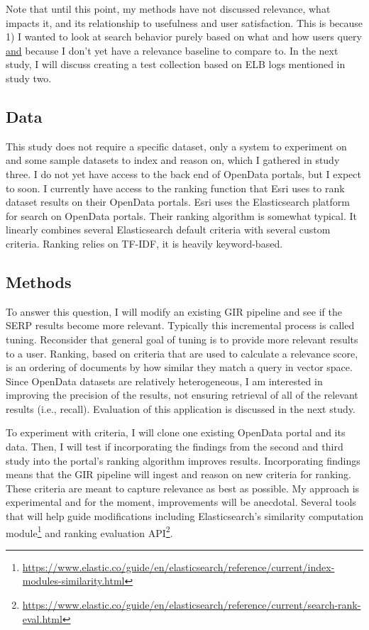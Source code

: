 Note that until this point, my methods have not discussed relevance, what impacts it, and its relationship to usefulness and user satisfaction. This is because 1) I wanted to look at search behavior purely based on what and how users query \underline{and} because I don't yet have a relevance baseline to compare to. In the next study, I will discuss creating a test collection based on ELB logs mentioned in study two.

\subsection{Data}
This study does not require a specific dataset, only a system to experiment on and some sample datasets to index and reason on, which I gathered in study three. I do not yet have access to the back end of OpenData portals, but I expect to soon. I currently have access to the ranking function that Esri uses to rank dataset results on their OpenData portals. Esri uses the Elasticsearch platform for search on OpenData portals. Their ranking algorithm is somewhat typical. It linearly combines several Elasticsearch default criteria with several custom criteria. Ranking relies on TF-IDF, it is heavily keyword-based. 

\subsection{Methods}

To answer this question, I will modify an existing GIR pipeline and see if the SERP results become more relevant. Typically this incremental process is called tuning. Reconsider that general goal of tuning is to provide more relevant results to a user. Ranking, based on criteria that are used to calculate a relevance score, is an ordering of documents by how similar they match a query in vector space. Since OpenData datasets are relatively heterogeneous, I am interested in improving the precision of the results, not ensuring retrieval of all of the relevant results (i.e., recall). Evaluation of this application is discussed in the next study.

To experiment with criteria, I will clone one existing OpenData portal and its data. Then, I will test if incorporating the findings from the second and third study into the portal's ranking algorithm improves results. Incorporating findings means that the GIR pipeline will ingest and reason on new criteria for ranking. These criteria are meant to capture relevance as best as possible. My approach is experimental and for the moment, improvements will be anecdotal. Several tools that will help guide modifications including Elasticsearch's similarity computation module\footnote{\url{https://www.elastic.co/guide/en/elasticsearch/reference/current/index-modules-similarity.html}} and  ranking evaluation API\footnote{\url{https://www.elastic.co/guide/en/elasticsearch/reference/current/search-rank-eval.html}}.

